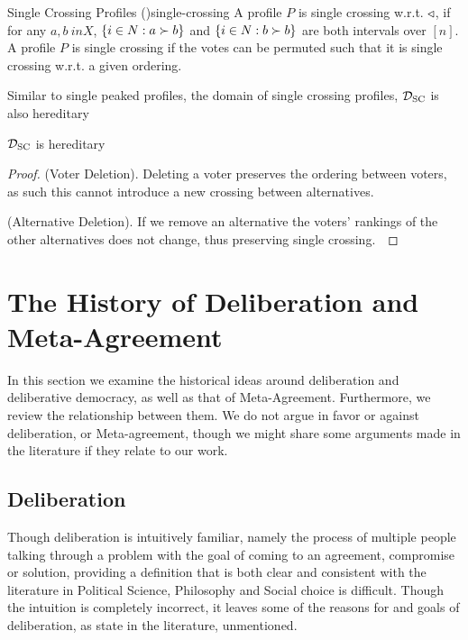 \begin{definition}{Single Crossing Profiles \textnormal{(\citet{Elkind_Lackner_Peters_2022})}}{single-crossing}
	A profile $P$ is single crossing w.r.t. $\triangleleft$, if for any $a,b \ in X$, $\{i \in N : a \succ b\}$ and $\{i \in N: b \succ b\}$ are both intervals over $[n]$. A profile $P$ is single crossing if the votes can be permuted such that it is single crossing w.r.t. a given ordering. 
\end{definition}

Similar to single peaked profiles, the domain of single crossing profiles, $\mathcal{D}_{\text{SC}}$ is also hereditary

\begin{proposition}
	$\mathcal{D}_{\text{SC}}$ is hereditary
\end{proposition}

\begin{proof}
	(Voter Deletion). Deleting a voter preserves the ordering between voters, as such this cannot introduce a new crossing between alternatives.~\checkmark

	(Alternative Deletion). If we remove an alternative the voters' rankings of the other alternatives does not change, thus preserving single crossing.~\checkmark
\end{proof}

\section{The History of Deliberation and Meta-Agreement}
In this section we examine the historical ideas around deliberation and deliberative democracy, as well as that of Meta-Agreement. Furthermore, we review the relationship between them. We do not argue in favor or against deliberation, or Meta-agreement, though we might share some arguments made in the literature if they relate to our work.

\subsection{Deliberation}
Though deliberation is intuitively familiar, namely the process of multiple people talking through a problem with the goal of coming to an agreement, compromise or solution, providing a definition that is both clear and consistent with the literature in Political Science, Philosophy and Social choice is difficult. Though the intuition is completely incorrect, it leaves some of the reasons for and goals of deliberation, as state in the literature, unmentioned. 


